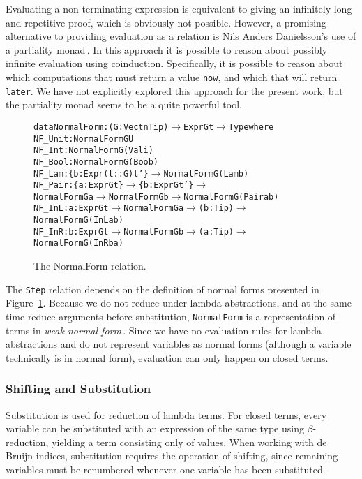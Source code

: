 Evaluating a non-terminating expression is equivalent to giving an infinitely long and repetitive proof, which is obviously not possible. However, a promising alternative to providing evaluation as a relation is Nils Anders Danielsson's use of a partiality monad\,\cite{Danielsson:2012:OSU:2364527.2364546}. In this approach it is possible to reason about possibly infinite evaluation using coinduction. Specifically, it is possible to reason about which computations that must return a value \texttt{now}, and which that will return \texttt{later}. We have not explicitly explored this approach for the present work, but the partiality monad seems to be a quite powerful tool.

\begin{figure}
\begin{alltt}
  data NormalForm : (G: Vect n Tip) \(\rightarrow\) Expr G t \(\rightarrow\) Type where
    NF_Unit : NormalForm G U
    NF_Int  : NormalForm G (Val i)
    NF_Bool : NormalForm G (Boo b)
    NF_Lam  : \{b: Expr (t :: G) t'\} \(\rightarrow\) NormalForm G (Lam b)
    NF_Pair : \{a: Expr G t\} \(\rightarrow\) \{b: Expr G t'\} \(\rightarrow\) 
              NormalForm G a \(\rightarrow\) NormalForm G b \(\rightarrow\) NormalForm G (Pair a b)
    NF_InL  : {a: Expr G t} \(\rightarrow\) NormalForm G a \(\rightarrow\) (b: Tip) \(\rightarrow\) 
              NormalForm G (InL a b)
    NF_InR  : {b: Expr G t} \(\rightarrow\) NormalForm G b \(\rightarrow\) (a: Tip) \(\rightarrow\) 
              NormalForm G (InR b a)
\end{alltt}
\caption{The NormalForm relation.}
\label{fig:normal-forms}
\end{figure}
The \texttt{Step} relation depends on the definition of normal forms presented in Figure~\ref{fig:normal-forms}. Because we do not reduce under lambda abstractions, and at the same time reduce arguments before substitution, \texttt{NormalForm} is a representation of terms in \emph{weak normal form}\,\cite{Sestoft:reduction}. Since we have no evaluation rules for lambda abstractions and do not represent variables as normal forms (although a variable technically is in normal form), evaluation can only happen on closed terms.

\subsubsection{Shifting and Substitution}
Substitution is used for reduction of lambda terms. For closed terms, every variable can be substituted with an expression of the same type using $\beta$-reduction, yielding a term consisting only of values. When working with de Bruijn indices, substitution requires the operation of shifting, since remaining variables must be renumbered whenever one variable has been substituted.

